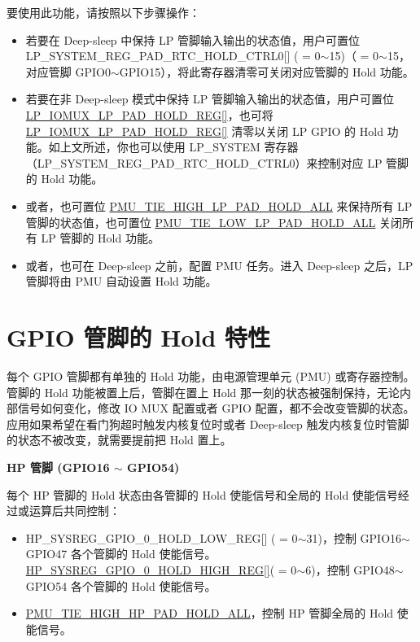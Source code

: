\documentclass[main\_\_CN.tex]{subfiles}
\begin{document}
{要使用此功能，请按照以下步骤操作：    
\begin{itemize}
        \item 若要在 Deep-sleep 中保持 LP 管脚输入输出的状态值，用户可置位 LP\_SYSTEM\_REG\_PAD\_RTC\_HOLD\_CTRL0[] ( = 0$\sim$15)（ = 0$\sim$15，对应管脚 GPIO0$\sim$GPIO15），将此寄存器清零可关闭对应管脚的 Hold 功能。
        \item 若要在非 Deep-sleep 模式中保持 LP 管脚输入输出的状态值，用户可置位 \hyperref[regdesc:LPIOMUXLPPADHOLDREG]{LP\_IOMUX\_LP\_PAD\_HOLD\_REG[]}，也可将 \hyperref[regdesc:LPIOMUXLPPADHOLDREG]{LP\_IOMUX\_LP\_PAD\_HOLD\_REG[]} 清零以关闭 LP GPIO 的 Hold 功能。如上文所述，你也可以使用 LP\_SYSTEM 寄存器（LP\_SYSTEM\_REG\_PAD\_RTC\_HOLD\_CTRL0）来控制对应 LP 管脚的 Hold 功能。
        \item 或者，也可置位 \hyperref[fielddesc:PMUTIEHIGHLPPADHOLDALL]{PMU\_TIE\_HIGH\_LP\_PAD\_HOLD\_ALL} 来保持所有 LP 管脚的状态值，也可置位 \hyperref[fielddesc:PMUTIELOWLPPADHOLDALL]{PMU\_TIE\_LOW\_LP\_PAD\_HOLD\_ALL} 关闭所有 LP 管脚的 Hold 功能。
        \item 或者，也可在 Deep-sleep 之前，配置 PMU 任务。进入 Deep-sleep 之后，LP 管脚将由 PMU 自动设置 Hold 功能。
    \end{itemize}
}{
\section{GPIO 管脚的 Hold 特性}\label{PadHold}

每个 GPIO 管脚都有单独的 Hold 功能，由电源管理单元 (PMU) 或寄存器控制。管脚的 Hold 功能被置上后，管脚在置上 Hold 那一刻的状态被强制保持，无论内部信号如何变化，修改 IO MUX 配置或者 GPIO 配置，都不会改变管脚的状态。应用如果希望在看门狗超时触发内核复位时或者 Deep-sleep 触发内核复位时管脚的状态不被改变，就需要提前把 Hold 置上。

\textbf{HP 管脚 (GPIO16 $\sim$ GPIO54)}

每个 HP 管脚的 Hold 状态由各管脚的 Hold 使能信号和全局的 Hold 使能信号经过或运算后共同控制：
\begin{itemize}
    \item HP\_SYSREG\_GPIO\_0\_HOLD\_LOW\_REG[] ( = 0$\sim$31)，控制 GPIO16$\sim$GPIO47 各个管脚的 Hold 使能信号。\hyperref[regdesc:HPSYS0HOLDHIGHREG]{HP\_SYSREG\_GPIO\_0\_HOLD\_HIGH\_REG[]}( = 0$\sim$6)，控制 GPIO48$\sim$GPIO54 各个管脚的 Hold 使能信号。
    \item \hyperref[fielddesc:PMUTIEHIGHHPPADHOLDALL]{PMU\_TIE\_HIGH\_HP\_PAD\_HOLD\_ALL}，控制 HP 管脚全局的 Hold 使能信号。
\end{itemize}

}
\end{document}
